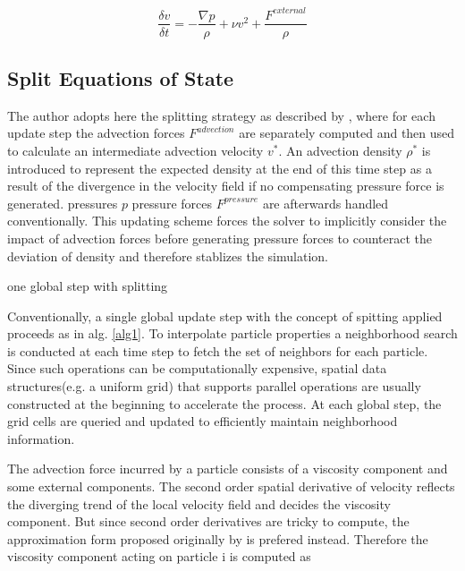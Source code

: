 \documentclass[
	11pt, 
	DIV10,
	ngerman,
	a4paper, 
	oneside, 
	headings=normal, 
	captions=tableheading,
	final, 
	numbers=noenddot
]{scrartcl}
\begin{document}
\begin{equation}
	\label{equa:1}
	\frac{\delta v}{\delta t} = -\frac{\nabla p}{\rho} + \nu v^{2} + \frac{F^{external}}{\rho}
\end{equation}

\subsection{Split Equations of State}

The author adopts here the splitting strategy as described by \cite{ihmsen2014sph}, where for each update step the advection forces $ F^{advection} $ are separately computed and then used to calculate an intermediate advection velocity $ v^{*} $. An advection density $ \rho^{*} $ is introduced to represent the expected density at the end of this time step as a result of the divergence in the velocity field if no compensating pressure force is generated. pressures $ p $ pressure forces $ F^{pressure} $ are afterwards handled conventionally. This updating scheme forces the solver to implicitly consider the impact of advection forces before generating pressure forces to counteract the deviation of density and therefore stablizes the simulation.

\vskip 0.2in
\begin{algorithm}[H]
	\caption{one global step with splitting \cite{reinhardt2017fully}}
	\label{alg1}
	\DontPrintSemicolon
	\SetAlgoLined
\end{algorithm}
\vskip 0.2in

Conventionally, a single global update step with the concept of spitting applied proceeds as in alg. \ref{alg1}. To interpolate particle properties a neighborhood search is conducted at each time step to fetch the set of neighbors for each particle. Since such operations can be computationally expensive, spatial data
structures(e.g. a uniform grid) that supports parallel operations are usually constructed at the beginning to accelerate the process. At each global step, the grid cells are queried and updated to efficiently maintain neighborhood information.
\par
The advection force incurred by a particle consists of a viscosity component and some external components. The second order spatial derivative of velocity reflects the diverging trend of the local velocity field and decides the viscosity component. But since second order derivatives are tricky to compute, the approximation form proposed originally by \cite{monaghan1992smoothed} is prefered instead. Therefore the viscosity component acting on particle i is computed as
\end{document}
